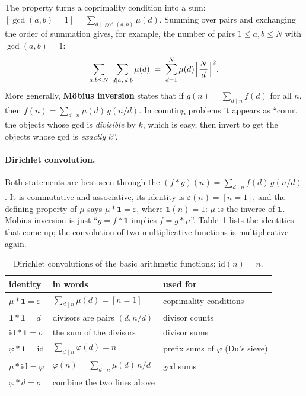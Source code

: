 The property turns a coprimality condition into a sum: $[\gcd(a, b) = 1] = \sum_{d \mid \gcd(a, b)} \mu(d)$. Summing over pairs and
exchanging the order of summation gives, for example, the number of pairs $1 \le a, b \le N$ with $\gcd(a, b) = 1$:
\[
  \sum_{a, b \le N} \; \sum_{d \mid a,\, d \mid b} \mu(d) \;=\; \sum_{d=1}^{N} \mu(d) \Bigl\lfloor \frac{N}{d} \Bigr\rfloor^2 .
\]
More generally, \textbf{M\"obius inversion} states that if $g(n) = \sum_{d \mid n} f(d)$ for all $n$, then $f(n) = \sum_{d \mid n}
\mu(d)\, g(n/d)$. In counting problems it appears as ``count the objects whose gcd is \emph{divisible} by $k$, which is easy, then
invert to get the objects whose gcd is \emph{exactly} $k$''.


\paragraph{Dirichlet convolution.} Both statements are best seen through the  $(f * g)(n) = \sum_{d \mid
n} f(d)\, g(n/d)$. It is commutative and associative, its identity is $\varepsilon(n) = [n = 1]$, and the defining property of $\mu$
says $\mu * \mathbf{1} = \varepsilon$, where $\mathbf{1}(n) = 1$: $\mu$ is the inverse of $\mathbf{1}$. M\"obius inversion is just
``$g = f * \mathbf{1}$ implies $f = g * \mu$''. Table~\ref{tab:dirichlet} lists the identities that come up; the convolution of two
multiplicative functions is multiplicative again.

\begin{table}[htbp]
\centering\small
\begin{tabular}{@{}lll@{}}
\toprule
identity & in words & used for \\
\midrule
$\mu * \mathbf{1} = \varepsilon$ & $\sum_{d \mid n} \mu(d) = [n = 1]$ & coprimality conditions \\
$\mathbf{1} * \mathbf{1} = d$ & divisors are pairs $(d, n/d)$ & divisor counts \\
$\mathrm{id} * \mathbf{1} = \sigma$ & the sum of the divisors & divisor sums \\
$\varphi * \mathbf{1} = \mathrm{id}$ & $\sum_{d \mid n} \varphi(d) = n$ & prefix sums of $\varphi$ (Du's sieve) \\
$\mu * \mathrm{id} = \varphi$ & $\varphi(n) = \sum_{d \mid n} \mu(d)\, n/d$ & gcd sums \\
$\varphi * d = \sigma$ & combine the two lines above & \\
\bottomrule
\end{tabular}
\caption{Dirichlet convolutions of the basic arithmetic functions; $\mathrm{id}(n) = n$.}
\label{tab:dirichlet}
\end{table}

